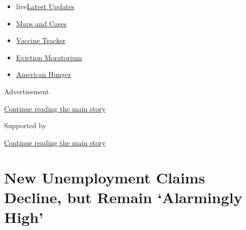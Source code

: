 \begin{itemize}
\tightlist
\item
  live\href{https://www.nytimes3xbfgragh.onion/2020/09/08/world/covid-19-coronavirus.html?name=styln-coronavirus-markets\&region=TOP_BANNER\&block=storyline_menu_recirc\&action=click\&pgtype=Article\&impression_id=20f73500-f1e8-11ea-8873-159c3de9cd3c\&variant=undefined}{Latest
  Updates}
\item
  \href{https://www.nytimes3xbfgragh.onion/interactive/2020/us/coronavirus-us-cases.html?name=styln-coronavirus-markets\&region=TOP_BANNER\&block=storyline_menu_recirc\&action=click\&pgtype=Article\&impression_id=20f73501-f1e8-11ea-8873-159c3de9cd3c\&variant=undefined}{Maps
  and Cases}
\item
  \href{https://www.nytimes3xbfgragh.onion/interactive/2020/science/coronavirus-vaccine-tracker.html?name=styln-coronavirus-markets\&region=TOP_BANNER\&block=storyline_menu_recirc\&action=click\&pgtype=Article\&impression_id=20f73502-f1e8-11ea-8873-159c3de9cd3c\&variant=undefined}{Vaccine
  Tracker}
\item
  \href{https://www.nytimes3xbfgragh.onion/2020/09/02/your-money/eviction-moratorium-covid.html?name=styln-coronavirus-markets\&region=TOP_BANNER\&block=storyline_menu_recirc\&action=click\&pgtype=Article\&impression_id=20f73503-f1e8-11ea-8873-159c3de9cd3c\&variant=undefined}{Eviction
  Moratorium}
\item
  \href{https://www.nytimes3xbfgragh.onion/interactive/2020/09/02/magazine/food-insecurity-hunger-us.html?name=styln-coronavirus-markets\&region=TOP_BANNER\&block=storyline_menu_recirc\&action=click\&pgtype=Article\&impression_id=20f73504-f1e8-11ea-8873-159c3de9cd3c\&variant=undefined}{American
  Hunger}
\end{itemize}

Advertisement

\protect\hyperlink{after-top}{Continue reading the main story}

Supported by

\protect\hyperlink{after-sponsor}{Continue reading the main story}

\hypertarget{new-unemployment-claims-decline-but-remain-alarmingly-high}{%
\section{New Unemployment Claims Decline, but Remain `Alarmingly
High'}\label{new-unemployment-claims-decline-but-remain-alarmingly-high}}

